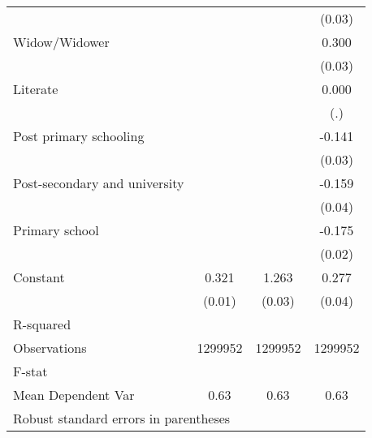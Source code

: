 {\begin{tabular}{l*{3}{c}}
                    &                     &                     &      (0.03)         \\
Widow/Widower       &                     &                     &       0.300\sym{***}\\
                    &                     &                     &      (0.03)         \\
Literate            &                     &                     &       0.000         \\
                    &                     &                     &         (.)         \\
Post primary schooling&                     &                     &      -0.141\sym{***}\\
                    &                     &                     &      (0.03)         \\
Post-secondary and university&                     &                     &      -0.159\sym{***}\\
                    &                     &                     &      (0.04)         \\
Primary school      &                     &                     &      -0.175\sym{***}\\
                    &                     &                     &      (0.02)         \\
Constant            &       0.321\sym{***}&       1.263\sym{***}&       0.277\sym{***}\\
                    &      (0.01)         &      (0.03)         &      (0.04)         \\
\hline
R-squared           &                     &                     &                     \\
Observations        &     1299952         &     1299952         &     1299952         \\
F-stat              &                     &                     &                     \\
Mean Dependent Var  &        0.63         &        0.63         &        0.63         \\
\hline\hline
\multicolumn{4}{l}{\footnotesize Robust standard errors in parentheses}\\
\end{tabular}
}
